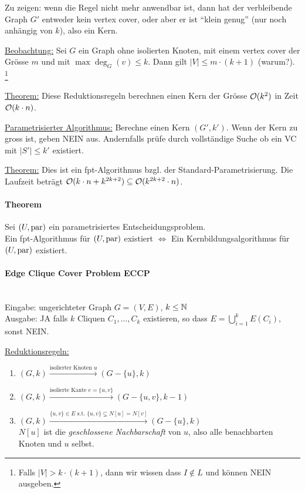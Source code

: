 Zu zeigen: wenn die Regel nicht mehr anwendbar ist, dann hat der verbleibende Graph $G'$ entweder kein vertex cover,
oder aber er ist ``klein genug'' (nur noch anhängig von $k$), also ein Kern.

\underline{Beobachtung:}
Sei $G$ ein Graph ohne isolierten Knoten, mit einem vertex cover der Grösse $m$ und mit $\max \deg_G(v) \leq k$.
Dann gilt $|V| \leq m \cdot (k+1)$ (warum?).%
\footnote{Falls $|V| > k \cdot (k+1)$, dann wir wissen dass $ I \notin L$ und können NEIN ausgeben.}

\underline{Theorem:}
Diese Reduktionsregeln berechnen einen Kern der Grösse $\mathcal{O} (k^2)$ in Zeit $\mathcal{O} (k \cdot n)$.

\underline{Parametrisierter Algorithmus:}
Berechne einen Kern $(G', k')$. Wenn der Kern zu gross ist, geben NEIN aus.
Andernfalls prüfe durch vollständige Suche ob ein VC mit $|S'| \leq k'$ existiert.

\underline{Theorem:}
Dies ist ein fpt-Algorithmus bzgl. der Standard-Parametrisierung. Die Laufzeit beträgt
$\mathcal{O} (k \cdot n + k^{2k+2}) \subseteq \mathcal{O} (k^{2k+2} \cdot n)$.

\paragraph{Theorem}
Sei $(U, \text{par})$ ein parametrisiertes Entscheidungsproblem. \\
Ein fpt-Algorithmus für $(U, \text{par})$ existiert $\iff$ Ein Kernbildungsalgorithmus für $(U, \text{par})$ existiert.

\paragraph{Edge Clique Cover Problem ECCP} \mbox{} \\
Eingabe: ungerichteter Graph $G=(V,E)$, $k \leq \mathbb{N}$ \\
Ausgabe: JA falls $k$ Cliquen $C_1, \dots, C_k$ existieren, so dass $E = \bigcup_{i=1}^k E(C_i)$, sonst NEIN.

\underline{Reduktionsregeln:}
\begin{enumerate}[label=(\roman*)]
    \item $(G, k) \xrightarrow{\text{isolierter Knoten } u} (G-\{ u \}, k)$
    \item $(G, k) \xrightarrow{\text{isolierte Kante } e=\{u,v\} } (G-\{ u,v \}, k-1)$
    \item $(G, k) \xrightarrow{\{u,v\} \in E \text{ s.t. } \{u,v\} \subsetneq N[u] = N[v] } (G-\{ u \}, k)$ \\
    $N[u]$ ist die \emph{geschlossene Nachbarschaft} von $u$, also alle benachbarten Knoten und $u$ selbst.
\end{enumerate}

